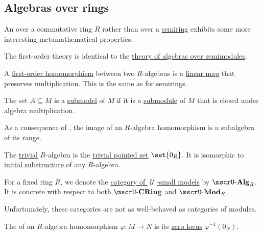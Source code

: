 \subsection{Algebras over rings}\label{subsec:algebras_over_rings}

\begin{definition}\label{def:algebra_over_ring}
  An  over a commutative ring \( R \) rather than over a \hyperref[def:algebra_over_semiring]{semiring} exhibits some more interesting metamathematical properties.

  \begin{thmenum}
     The first-order theory is identical to the \hyperref[def:algebra_over_semiring/theory]{theory of algebras over semimodules}.

     A \hyperref[def:first_order_homomorphism]{first-order homomorphism} between two \( R \)-algebras is a \hyperref[def:semimodule/homomorphism]{linear map} that preserves multiplication. This is the same as for semirings.

     The set \( A \subseteq M \) is a \hyperref[thm:substructure_is_model]{submodel} of \( M \) if it is a \hyperref[def:monoid/submodel]{submodule} of \( M \) that is closed under algebra multiplication.

    As a consequence of , the image of an \( R \)-algebra homomorphism is a subalgebra of its range.

     The \hyperref[def:trivial_structure]{trivial} \( R \)-algebra is the \hyperref[rem:pointed_set/trivial]{trivial pointed set} \( \set{ 0_R } \). It is isomorphic to \hyperref[thm:substructures_form_complete_lattice/bottom]{initial substructure} of any \( R \)-algebra.

     For a fixed ring \( R \), we denote the \hyperref[def:category_of_small_first_order_models]{category of \( \mscrU \)-small models} by \( \ucat{Alg}_R \). It is concrete with respect to both \( \ucat{CRing} \) and \( \ucat{Mod}_R \).

    Unfortunately, these categories are not as well-behaved as categories of modules.

     The  of an \( R \)-algebra homomorphism \( \varphi: M \to N \) is its \hyperref[def:zero_locus]{zero locus} \( \varphi^{-1}(0_N) \).


\end{thmenum}
\end{definition}
